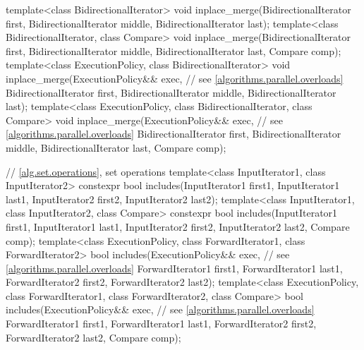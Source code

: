 \begin{codeblock}
{  template<class BidirectionalIterator>
    void inplace_merge(BidirectionalIterator first,
                       BidirectionalIterator middle,
                       BidirectionalIterator last);
  template<class BidirectionalIterator, class Compare>
    void inplace_merge(BidirectionalIterator first,
                       BidirectionalIterator middle,
                       BidirectionalIterator last, Compare comp);
  template<class ExecutionPolicy, class BidirectionalIterator>
    void inplace_merge(ExecutionPolicy&& exec, // see \ref{algorithms.parallel.overloads}
                       BidirectionalIterator first,
                       BidirectionalIterator middle,
                       BidirectionalIterator last);
  template<class ExecutionPolicy, class BidirectionalIterator, class Compare>
    void inplace_merge(ExecutionPolicy&& exec, // see \ref{algorithms.parallel.overloads}
                       BidirectionalIterator first,
                       BidirectionalIterator middle,
                       BidirectionalIterator last, Compare comp);

  // \ref{alg.set.operations}, set operations
  template<class InputIterator1, class InputIterator2>
    constexpr bool includes(InputIterator1 first1, InputIterator1 last1,
                            InputIterator2 first2, InputIterator2 last2);
  template<class InputIterator1, class InputIterator2, class Compare>
    constexpr bool includes(InputIterator1 first1, InputIterator1 last1,
                            InputIterator2 first2, InputIterator2 last2,
                            Compare comp);
  template<class ExecutionPolicy, class ForwardIterator1, class ForwardIterator2>
    bool includes(ExecutionPolicy&& exec, // see \ref{algorithms.parallel.overloads}
                  ForwardIterator1 first1, ForwardIterator1 last1,
                  ForwardIterator2 first2, ForwardIterator2 last2);
  template<class ExecutionPolicy, class ForwardIterator1, class ForwardIterator2,
           class Compare>
    bool includes(ExecutionPolicy&& exec, // see \ref{algorithms.parallel.overloads}
                  ForwardIterator1 first1, ForwardIterator1 last1,
                  ForwardIterator2 first2, ForwardIterator2 last2,
                  Compare comp);

}
\end{codeblock}

